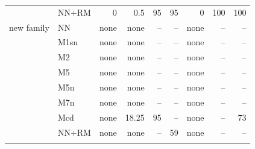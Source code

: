 \documentclass[pdflatex,sn-basic]{sn-jnl}
\begin{document}
\begin{table}[p]
\begin{tabular}{@{}llrrrrrrr@{}}
 & NN+RM & 0 & 0.5 & 95 & 95 & 0 & 100 & 100 \\
new family & NN & none & none & -- & -- & none & -- & -- \\
 & M1sn & none & none & -- & -- & none & -- & -- \\
 & M2 & none & none & -- & -- & none & -- & -- \\
 & M5 & none & none & -- & -- & none & -- & -- \\
 & M5n & none & none & -- & -- & none & -- & -- \\
 & M7n & none & none & -- & -- & none & -- & -- \\
 & Mcd & none & 18.25 & 95 & -- & none & -- & 73 \\
 & NN+RM & none & none & -- & 59 & none & -- & -- \\
\botrule
\end{tabular}
\end{table}
\end{document}
